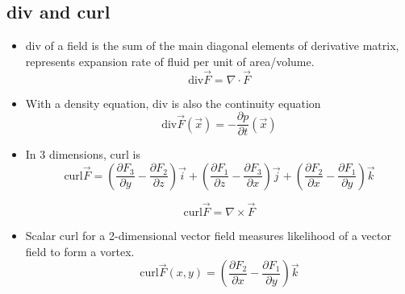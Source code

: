 \documentclass[11pt]{article}
\begin{document}
	\subsection*{div and curl}
		\begin{itemize}
			\item div of a field is the sum of the main diagonal elements of derivative matrix, represents expansion rate of fluid per unit of area/volume.
				\[\text{div}\vec{F} = \nabla \cdot \vec{F}\]
			\item With a density equation, div is also the continuity equation
				\[\text{div}\vec{F}(\vec{x}) = - \frac{\partial p}{\partial t}(\vec{x})\]
			\item In 3 dimensions, curl is
				\[\text{curl}\vec{F} = \left(\frac{\partial F_3}{\partial y} - \frac{\partial F_2}{\partial z} \right) \vec{i} + \left(\frac{\partial F_1}{\partial z} - \frac{\partial F_3}{\partial x} \right) \vec{j} + \left(\frac{\partial F_2}{\partial x} - \frac{\partial F_1}{\partial y} \right) \vec{k}\]
				
				\[\text{curl} \vec{F} = \nabla \times \vec{F}\]
			\item Scalar curl for a 2-dimensional vector field measures likelihood of a vector field to form a vortex.
				\[\text{curl} \vec{F}(x, y) = \left(\frac{\partial F_2}{\partial x} - \frac{\partial F_1}{\partial y} \right)\vec{k}\]
		\end{itemize}
%		
%		


\end{document}

